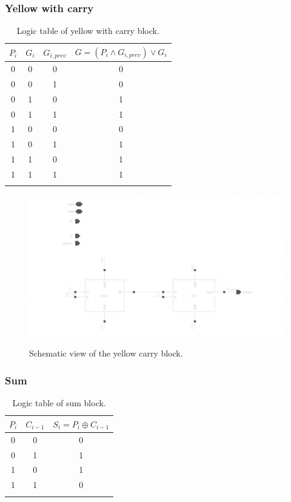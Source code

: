 \subsubsection{Yellow with carry}

\begin{table}[H]
  \caption{Logic table of yellow with carry block.}
  \centering
  \begin{tabular}{ccc|c}
    \toprule
    $P_i$ & $G_i$ & $G_{i,prev}$ & $G=(P_i \wedge G_{i,prev}) \vee G_i$  \\
    \midrule
    0 & 0 & 0 & 0 \\
    0 & 0 & 1 & 0 \\
    0 & 1 & 0 & 1 \\
    0 & 1 & 1 & 1 \\
    1 & 0 & 0 & 0 \\
    1 & 0 & 1 & 1 \\
    1 & 1 & 0 & 1 \\
    1 & 1 & 1 & 1 \\
    \bottomrule
    \label{tab:yellowcarry}
  \end{tabular}
\end{table}

\begin{figure}[H]
  \centering
  \captionsetup{justification=centering}
  {\includegraphics[width=1.2\textwidth]{../figures/yellow_carry}}
  \caption{Schematic view of the yellow carry block.} \label{fig:yellow_c}
\end{figure}

\subsubsection{Sum}

\begin{table}[H]
  \caption{Logic table of sum block.}
  \centering
  \begin{tabular}{cc|c}
    \toprule
    $P_i$ & $C_{i-1}$ & $S_i=P_i \oplus C_{i-1}$ \\
    \midrule
    0 & 0 & 0 \\
    0 & 1 & 1 \\
    1 & 0 & 1 \\
    1 & 1 & 0 \\
    \bottomrule
    \label{tab:sum}
  \end{tabular}
\end{table}

